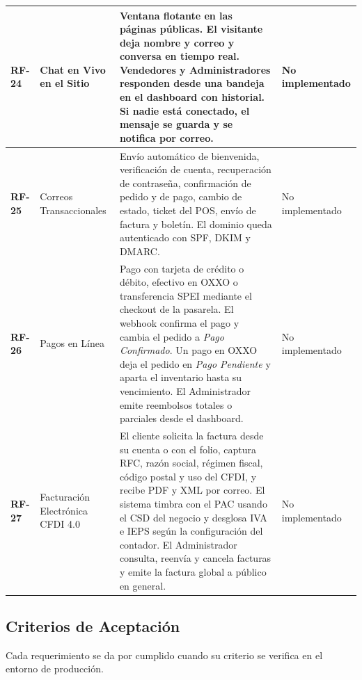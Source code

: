 \documentclass[11pt,letterpaper]{article}
\begin{document}
\begin{longtable}{@{} L{1.2cm} L{3.0cm} L{7.4cm} L{3.9cm} @{}}
\midrule
\textbf{RF-24} & Chat en Vivo en el Sitio & Ventana flotante en las páginas públicas. El visitante deja nombre y correo y conversa en tiempo real. Vendedores y Administradores responden desde una bandeja en el dashboard con historial. Si nadie está conectado, el mensaje se guarda y se notifica por correo. & No implementado \\
\midrule
\textbf{RF-25} & Correos Transaccionales & Envío automático de bienvenida, verificación de cuenta, recuperación de contraseña, confirmación de pedido y de pago, cambio de estado, ticket del POS, envío de factura y boletín. El dominio queda autenticado con SPF, DKIM y DMARC. & No implementado \\
\midrule
\textbf{RF-26} & Pagos en Línea & Pago con tarjeta de crédito o débito, efectivo en OXXO o transferencia SPEI mediante el checkout de la pasarela. El webhook confirma el pago y cambia el pedido a \textit{Pago Confirmado}. Un pago en OXXO deja el pedido en \textit{Pago Pendiente} y aparta el inventario hasta su vencimiento. El Administrador emite reembolsos totales o parciales desde el dashboard. & No implementado \\
\midrule
\textbf{RF-27} & Facturación Electrónica CFDI 4.0 & El cliente solicita la factura desde su cuenta o con el folio, captura RFC, razón social, régimen fiscal, código postal y uso del CFDI, y recibe PDF y XML por correo. El sistema timbra con el PAC usando el CSD del negocio y desglosa IVA e IEPS según la configuración del contador. El Administrador consulta, reenvía y cancela facturas y emite la factura global a público en general. & No implementado \\
\end{longtable}
\normalsize

\subsection{Criterios de Aceptación}
Cada requerimiento se da por cumplido cuando su criterio se verifica en el entorno de producción.
\end{document}

